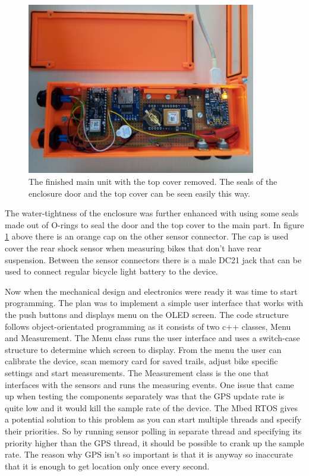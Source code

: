 \documentclass[a4paper,11pt]{article} %
\begin{document}
\begin{figure}[H]
    \centering
    \includegraphics[width=100mm]{Figures/measurement_unit.jpg}
    \caption{The finished main unit with the top cover removed. The seals of the enclosure door and the top cover can be seen easily this way.}
    \label{fig:enclosure_opened}
\end{figure}

The water-tightness of the enclosure was further enhanced with using some seals made out of O-rings to seal the door and the top cover to the main part. In figure \ref{fig:enclosure_opened} above there is an orange cap on the other sensor connector. The cap is used cover the rear shock sensor when measuring bikes that don't have rear suspension. Between the sensor connectors there is a male DC21 jack that can be used to connect regular bicycle light battery to the device.

Now when the mechanical design and electronics were ready it was time to start programming. The plan was to implement a simple user interface that works with the push buttons and displays menu on the OLED screen. The code structure follows object-orientated programming as it consists of two c++ classes, Menu and Measurement. The Menu class runs the user interface and uses a switch-case structure to determine which screen to display. From the menu the user can calibrate the device, scan memory card for saved trails, adjust bike specific settings and start measurements. The Measurement class is the one that interfaces with the sensors and runs the measuring events. One issue that came up when testing the components separately was that the GPS update rate is quite low and it would kill the sample rate of the device. The Mbed RTOS gives a potential solution to this problem as you can start multiple threads and specify their priorities. So by running sensor polling in separate thread and specifying its priority higher than the GPS thread, it should be possible to crank up the sample rate. The reason why GPS isn't so important is that it is anyway so inaccurate that it is enough to get location only once every second. 
\end{document}
